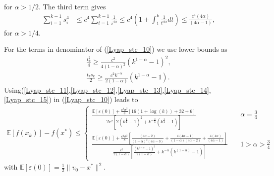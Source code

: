 \documentclass{article}
\theoremstyle{plain}
\theoremstyle{definition}
\theoremstyle{remark}
\begin{document}
         for $\alpha > 1/2$. The third term gives
        \begin{align}\label{Lyap_stc_14}
            \sum_{i=1}^{k-1} s_i^4&\leq c^4\sum_{i=1}^{k-1} \frac{1}{i^{4\alpha }}\leq c^4(1+\int_1^k\frac{1}{t^{4\alpha }}dt)\leq \frac{c^4(4\alpha )}{(4\alpha -1)},
         \end{align} 
         for $\alpha > 1/4$.\par
         For the terms in denominator of (\ref{Lyap_stc_10}) we use lower bounds as
         \begin{align}\label{Lyap_stc_15}
             \frac{t_k^2}{4}\geq \frac{c^2}{4(1-\alpha)^2}(k^{1-\alpha}-1)^2,\nonumber\\
             \frac{t_ks_k}{2}\geq \frac{c^2k^{-\alpha}}{2(1-\alpha)}(k^{1-\alpha}-1).
         \end{align}
Using(\ref{Lyap_stc_11},\ref{Lyap_stc_12},\ref{Lyap_stc_13},\ref{Lyap_stc_14},\ref{Lyap_stc_15}) in (\ref{Lyap_stc_10}) leads to
\begin{align}\label{Lyap_stc_16}
    \mathbb E[f(x_k)]-f(x^*)\leq \left\{\begin{array}{lr}
         \frac{\mathbb E[\varepsilon (0)]+\frac{c^4\sigma^2}{8}\left[16(1+\log(k))+32+6\right]}{2c^2\left[2(k^{\frac{1}{4}}-1)^2+k^{-\frac{3}{4}}(k^{\frac{1}{4}}-1)\right]} & \quad \alpha=\frac{3}{4} \\
          \frac{\mathbb E[\varepsilon (0)]+\frac{c^4\sigma^2}{8}\left[\frac{(4\alpha -2)}{(1-\alpha)^2(4\alpha-3)}+\frac{4(4\alpha -1)}{(1-\alpha)(4\alpha -2)}+\frac{4(4\alpha )}{(4\alpha -1)}\right]}{\frac{c^2}{2(1-\alpha)}\left[\frac{(k^{1-\alpha}-1)^2}{2(1-\alpha)}+k^{-\alpha}(k^{(1-\alpha)}-1)\right]}& \quad 1>\alpha>\frac{3}{4}
    \end{array}\right.
\end{align}
with $\mathbb E[\varepsilon (0)]=\frac{1}{2}\|v_0-x^*\|^2$. 
\end{document}
